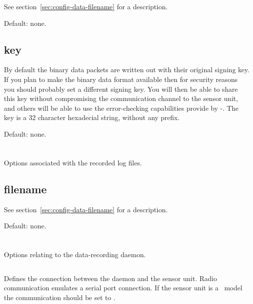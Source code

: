 See section~\ref{sec:config-data-filename} for a description.

Default: none.


\subsection{key}
By default the binary data packets are written out with their original signing
key. If you plan to make the binary data format available then for security
reasons you should probably set a different signing key. You will then be able
to share this key without compromising the communication channel to the sensor
unit, and others will be able to use the error-checking capabilities provide by
\hmac-\mdfive. The key is a 32 character hexadecial string, without any
 prefix.

Default: none.


\section{\code{[logfile]}}
Options associated with the recorded log files. 

\subsection{filename}

See section~\ref{sec:config-data-filename} for a description.

Default: none.



\section{\code[daemon]}
Options relating to the data-recording daemon.

\subsection{}
Defines the connection between the daemon and the sensor unit. Radio
communication emulates a serial port connection. If the sensor unit is a \PoE\
model the communication should be set to .

